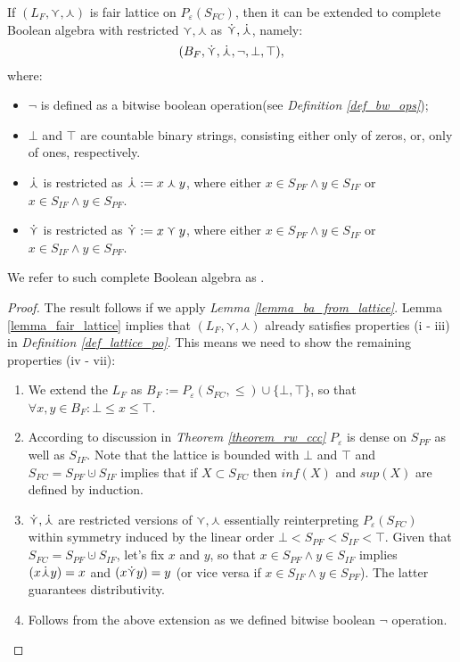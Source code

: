 \begin{lemma}\label{lemma_fair_ba}
  If $(L_{F}, \curlyvee, \curlywedge)$ is fair lattice on $P_{\varepsilon}(S_{FC})$, then it can be extended to complete Boolean algebra with restricted $\curlyvee, \curlywedge$ as $\dot{\curlyvee}, \dot{\curlywedge}$, namely:
    \[ (B_{F}, \dot{\curlyvee}, \dot{\curlywedge}, \neg, \bot, \top), \]
  where: 
    \begin{itemize}
      \item $\neg$ is defined as a bitwise boolean operation(see \textit{Definition \ref{def_bw_ops}});
      \item $\bot$ and $\top$ are countable binary strings, consisting either only of zeros, or, only of ones, respectively.
      \item $\dot{\curlywedge}$ is restricted as $\dot{\curlywedge} := x \curlywedge y $, where either $x \in S_{PF} \land y \in S_{IF}$ or $x \in S_{IF} \land y \in S_{PF}$.
      \item $\dot{\curlyvee}$ is restricted as $\dot{\curlyvee} := x \curlyvee y $, where either $x \in S_{PF} \land y \in S_{IF}$ or $x \in S_{IF} \land y \in S_{PF}$.
    \end{itemize}
  We refer to such complete Boolean algebra as .
\end{lemma}
\begin{proof}  
  The result follows if we apply \textit{Lemma \ref{lemma_ba_from_lattice}}. Lemma \ref{lemma_fair_lattice} implies that $(L_{F}, \curlyvee, \curlywedge)$ already satisfies properties (i - iii) in \textit{Definition \ref{def_lattice_po}}. This means we need to show the remaining properties (iv - vii):
  \begin{enumerate}[label=(\roman*), start=4]
    \item We extend the $L_{F}$ as $B_{F} := P_{\varepsilon}(S_{FC}, \leq) \cup \{\bot, \top\}$, so that $\forall x,y \in B_{F}: \bot \leq x \leq \top$.
    \item According to discussion in \textit{Theorem \ref{theorem_rw_ccc}} $P_{\varepsilon}$ is dense on $S_{PF}$ as well as $S_{IF}$. Note that the lattice is bounded with $\bot$ and $\top$ and $S_{FC} = S_{PF} \cupdot S_{IF}$ implies that if $X \subset S_{FC}$ then $inf(X)$ and $sup(X)$ are defined by induction.
    \item $\dot{\curlyvee}, \dot{\curlywedge}$ are restricted versions of $\curlyvee, \curlywedge$ essentially reinterpreting $P_{\varepsilon}(S_{FC})$ within symmetry induced by the linear order $\bot < S_{PF} < S_{IF} < \top$. Given that $S_{FC} = S_{PF} \cupdot S_{IF}$, let's fix $x$ and $y$, so that $x \in S_{PF} \land y \in S_{IF}$ implies $(x \dot{\curlywedge} y) = x$ and $(x \dot{\curlyvee} y) = y$ (or vice versa if $x \in S_{IF} \land y \in S_{PF}$). The latter guarantees distributivity. 
    \item Follows from the above extension as we defined bitwise boolean $\neg$ operation.
  \end{enumerate}
\end{proof}

